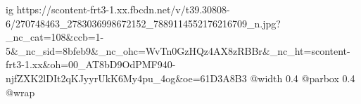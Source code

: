  
 
 
 
 

\ifcmt
  ig https://scontent-frt3-1.xx.fbcdn.net/v/t39.30808-6/270748463_2783036998672152_7889114552176216709_n.jpg?_nc_cat=108&ccb=1-5&_nc_sid=8bfeb9&_nc_ohc=WvTn0GzHQz4AX8zRBBr&_nc_ht=scontent-frt3-1.xx&oh=00_AT8bD9OdPMF940-njfZXK2lDIt2qKJyyrUkK6My4pu_4og&oe=61D3A8B3
  @width 0.4
  @parbox 0.4
  @wrap \parpic[r]
\fi
